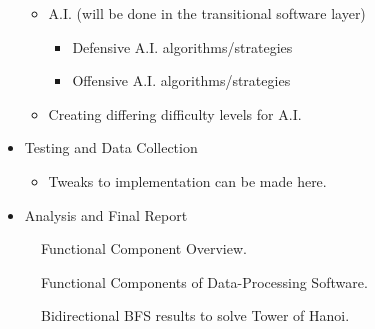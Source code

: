 \documentclass[letterpaper, 10 pt, conference]{ieeeconf}
\begin{document}
\begin{itemize}
\begin{itemize}
\item A.I. (will be done in the transitional software layer)
\begin{itemize}
\item Defensive A.I. algorithms/strategies
\item Offensive A.I. algorithms/strategies
\end{itemize}
\item Creating differing difficulty levels for A.I.
\end{itemize}
\item Testing and Data Collection
\begin{itemize}
\item Tweaks to implementation can be made here.
\end{itemize}
\item Analysis and Final Report
\end{itemize}
\begin{figure}[!h]
\centering
{}
\caption{Functional Component Overview.}
\label{fig_1}
\end{figure}
\begin{figure}[!h]
\centering
{}
\caption{Functional Components of Data-Processing Software.}
\label{fig_2}
\end{figure}
\begin{figure}[!h]
\centering
{}
\caption{Bidirectional BFS results to solve Tower of Hanoi.}
\label{fig_3}
\end{figure}


\end{document}
